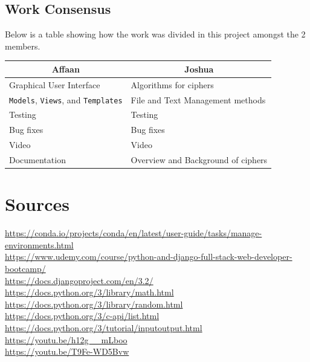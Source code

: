 \documentclass[a4paper, 12pt, titlepage]{report}
\begin{document}
\section{Work Consensus}
Below is a table showing how the work was divided in this project amongst the 2 members.
\begin{table}[H]
\centering
\begin{tabular}{@{}ll@{}}
\toprule
\multicolumn{1}{c}{Affaan}   & \multicolumn{1}{c}{Joshua}         \\ \midrule
Graphical User Interface     & Algorithms for ciphers             \\
\texttt{Models}, \texttt{Views}, and \texttt{Templates} & File and Text Management methods            \\
Testing                      & Testing                            \\
Bug fixes                    & Bug fixes                          \\
Video                        & Video                              \\
Documentation                & Overview and Background of ciphers \\ \bottomrule
\end{tabular}
\end{table}
\chapter{Sources}
\url{https://conda.io/projects/conda/en/latest/user-guide/tasks/manage-environments.html}\\
\url{https://www.udemy.com/course/python-and-django-full-stack-web-developer-bootcamp/}\\
\url{https://docs.djangoproject.com/en/3.2/}\\
\url{https://docs.python.org/3/library/math.html}\\
\url{https://docs.python.org/3/library/random.html}\\
\url{https://docs.python.org/3/c-api/list.html}\\
\url{https://docs.python.org/3/tutorial/inputoutput.html}\\
\url{https://youtu.be/h12g__mLboo}\\
\url{https://youtu.be/T9Fe-WD5Bvw}\\
\end{document}
